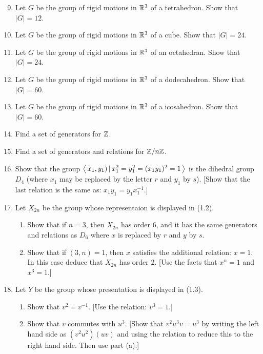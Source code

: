 \documentclass[10pt,a4paper]{report}
\begin{document}
\begin{enumerate}
\setcounter{enumi}{8}
\item Let $G$ be the group of rigid motions in $\mathbb{R}^3$ of a tetrahedron.  Show that $|G|=12$.

\item Let $G$ be the group of rigid motions in $\mathbb{R}^3$ of a cube.  Show that $|G|=24$.

\item Let $G$ be the group of rigid motions in $\mathbb{R}^3$ of an octahedran.  Show that $|G|=24$.

\item Let $G$ be the group of rigid motions in $\mathbb{R}^3$ of a dodecahedron.  Show that $|G|=60$.

\item Let $G$ be the group of rigid motions in $\mathbb{R}^3$ of a icosahedron.  Show that $|G|=60$.

\item Find a set of generators for $\mathbb{Z}$.

\item Find a set of generators and relations for $\mathbb{Z}/n\mathbb{Z}$.

\item Show that the group $\left \langle\, x_1,y_1)\,|\,x_1^2=y_1^2=(x_1y_1)^2=1 \,\right \rangle$ is the dihedral group $D_4$ (where $x_1$ may be replaced by the letter $r$ and $y_1$ by $s$).  [Show that the last relation is the same as: $x_1y_1=y_1x_1^{-1}$.]

\item Let $X_{2n}$ be the group whose representaion is displayed in (1.2).
\begin{enumerate}
	\item Show that if $n=3$, then $X_{2n}$ has order 6, and it has the same generators and relations as $D_6$ where $x$ is replaced by $r$ and $y$ by $s$.
	
	\item Show that if $(3,n)=1$, then $x$ satisfies the additional relation: $x=1$.  In this case deduce that $X_{2n}$ has order 2.  [Use the facts that $x^n=1$ and $x^3=1$.]

\end{enumerate}

\item Let $Y$ be the group whose presentation is displayed in (1.3).
\begin{enumerate}
	\item Show that $v^2=v^{-1}$. [Use the relation: $v^3=1$.]
	
	\item  Show that $v$ commutes with $u^3$.  [Show that $v^2u^3v=u^3$ by writing the left hand side as $(v^2u^2)(uv)$ and using the relation to reduce this to the right hand side.  Then use part (a).]
	

\end{enumerate}
\end{enumerate}
\end{document}
